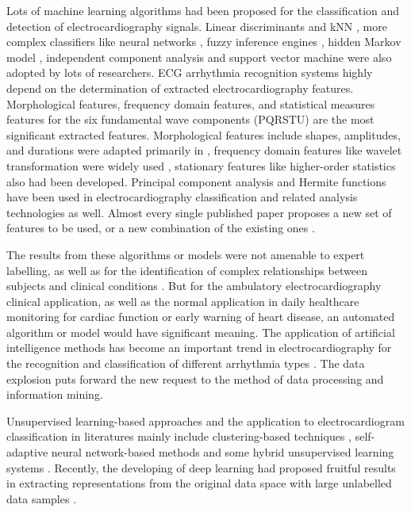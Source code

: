\documentclass[journal]{IEEEtran}
\begin{document}
Lots of machine learning algorithms had been proposed for the classification and detection of electrocardiography signals. 
Linear discriminants \cite{chaza} and kNN \cite{melgan}, more complex classifiers like neural networks \cite{jiang, olmez, lin, osowski}, fuzzy inference engines \cite{osowski, kundu}, hidden Markov model \cite{andreao, coast}, independent component analysis \cite{zhu} and support vector machine  \cite{melgan, kampoura, khandoker} were also adopted by lots of researchers.  
ECG arrhythmia recognition systems highly depend on the determination of extracted electrocardiography features. 
Morphological features, frequency domain features, and statistical measures features for the six fundamental wave components (PQRSTU) are the most significant extracted features\cite{chia}. 
Morphological features include shapes, amplitudes, and durations were adapted primarily in \cite{jekova, christove, can}, frequency domain features like wavelet transformation were widely used \cite{inan}, \cite{banerjee} stationary features like higher-order statistics also had been developed. 
Principal component analysis \cite{stam} and Hermite functions \cite{lager} have been used in electrocardiography classification and related analysis technologies as well.
Almost every single published paper proposes a new set of features to be used, or a new combination of the existing ones \cite{mar}.


The results from these algorithms or models were not amenable to expert labelling, as well as for the identification of complex relationships between subjects and clinical conditions \cite{clifford}.
But for the ambulatory electrocardiography clinical application, as well as the normal application in daily healthcare monitoring for cardiac function or early warning of heart disease, an automated algorithm or model would have significant meaning.
The application of artificial intelligence methods has become an important trend in electrocardiography for the recognition and classification of different arrhythmia types \cite{clifford}. 
The data explosion puts forward the new request to the method of data processing and information mining.


Unsupervised learning-based approaches and the application to electrocardiogram classification in literatures mainly include clustering-based techniques \cite{lager, nishizawa, maier}, self-adaptive neural network-based methods \cite{palreddy, risk} and some hybrid unsupervised learning systems \cite{tadejko}. 
Recently, the developing of deep learning had proposed fruitful results in extracting representations from the original data space with large unlabelled data samples \cite{gogna2017semi}.
\end{document}

